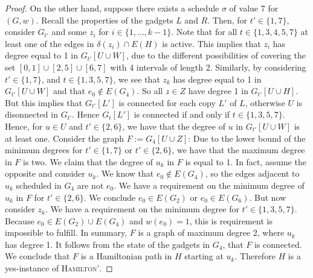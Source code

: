 \documentclass[runningheads]{llncs}
\numberwithin{equation}{section}
\newcommand{\set}[1]{\{ #1 \}}
\newcommand{\fromto}[2]{\set{#1, \ldots, #2}}
\begin{document}
\begin{proof}
On the other hand, suppose there exists a schedule $\sigma$ of value 7 for $(G, w)$.
Recall the properties of the gadgets $L$ and $R$. Then, for $t' \in \set{1, 7}$, consider $G_{t'}$ and some $z_i$ for $i \in \fromto{1}{k-1}$. Note that for all $t \in \set{1, 3, 4, 5, 7}$ at least one of the edges in $\delta(z_i) \cap E(H)$ is active. This implies that $z_i$ has degree equal to 1 in $G_{t'}[U \cup W]$, due to the different possibilities of covering the set $[0, 1] \cup [2, 5] \cup [6, 7]$ with 4 intervals of length 2. Similarly, by considering $t' \in \set{1, 7}$, and $t \in \set{1, 3, 5, 7}$, we see that $z_k$ has degree equal to 1 in $G_{t'}[U \cup W]$ and that $e_0 \not \in E(G_{4})$. So all $z \in Z$ have degree 1 in $G_{t'}[U \cup H]$. But this implies that $G_{t'}[L']$ is connected for each copy $L'$ of $L$, otherwise $U$ is disonnected in $G_{t'}$. Hence $G_t[L']$ is connected if and only if $t \in \set{1, 3, 5, 7}$. Hence, for $u \in U$ and $t' \in \set{2, 6}$, we have that the degree of $u$ in $G_{t'}[U \cup W]$ is at least one. Consider the graph $F := G_{4}[U \cup Z]$: Due to the lower bound of the minimum degrees for $t' \in \set{1, 7}$ or $t' \in \set{2, 6}$, we have that the maximum degree in $F$ is two. We claim that the degree of $u_k$ in $F$ is equal to 1. In fact, assume the opposite and consider $u_k$. We know that $e_0 \not\in E(G_4)$, so the edges adjacent to $u_k$ scheduled in $G_4$ are not $e_0$. We have a requirement on the minimum degree of $u_k$ in $F$ for $t' \in \set{2, 6}$. We conclude $e_0 \in E(G_2)$ or $e_0 \in E(G_6)$. But now consider $z_k$. We have a requirement on the minimum degree for $t' \in \set{1, 3, 5, 7}$. Because $e_0 \in E(G_2) \cup E(G_4)$ and $w(e_0) = 1$, this is requirement is impossible to fulfill.
In summary, $F$ is a graph of maximum degree 2, where $u_k$ has degree 1. It follows from the state of the gadgets in $G_4$, that $F$ is connected. We conclude that $F$ is a Hamiltonian path in $H$ starting at $u_k$. Therefore $H$ is a yes-instance of \textsc{Hamilton'}.

\end{proof}
\end{document}
